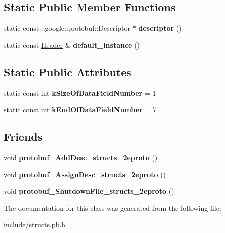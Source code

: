 \subsection*{Static Public Member Functions}
\begin{DoxyCompactItemize}
\item 
\hypertarget{classstruct_definitions_1_1_header_aa3a022ee50eba4caf6caa315e5986cc1}{}\label{classstruct_definitions_1_1_header_aa3a022ee50eba4caf6caa315e5986cc1} 
static const \+::google\+::protobuf\+::\+Descriptor $\ast$ {\bfseries descriptor} ()
\item 
\hypertarget{classstruct_definitions_1_1_header_a89695ae239efa3812e4d4b283a72f28e}{}\label{classstruct_definitions_1_1_header_a89695ae239efa3812e4d4b283a72f28e} 
static const \hyperlink{classstruct_definitions_1_1_header}{Header} \& {\bfseries default\+\_\+instance} ()
\end{DoxyCompactItemize}
\subsection*{Static Public Attributes}
\begin{DoxyCompactItemize}
\item 
\hypertarget{classstruct_definitions_1_1_header_a97581ebc6dd48fd42dab9c6d5c959be9}{}\label{classstruct_definitions_1_1_header_a97581ebc6dd48fd42dab9c6d5c959be9} 
static const int {\bfseries k\+Size\+Of\+Data\+Field\+Number} = 1
\item 
\hypertarget{classstruct_definitions_1_1_header_a36d0ee6deb64e230776f0fcf853a5f2e}{}\label{classstruct_definitions_1_1_header_a36d0ee6deb64e230776f0fcf853a5f2e} 
static const int {\bfseries k\+End\+Of\+Data\+Field\+Number} = 7
\end{DoxyCompactItemize}
\subsection*{Friends}
\begin{DoxyCompactItemize}
\item 
\hypertarget{classstruct_definitions_1_1_header_abcf9b7cc173b6d79696d01156751b8ce}{}\label{classstruct_definitions_1_1_header_abcf9b7cc173b6d79696d01156751b8ce} 
void {\bfseries protobuf\+\_\+\+Add\+Desc\+\_\+structs\+\_\+2eproto} ()
\item 
\hypertarget{classstruct_definitions_1_1_header_adb32752ff5178cb902966da6e3cb3bc6}{}\label{classstruct_definitions_1_1_header_adb32752ff5178cb902966da6e3cb3bc6} 
void {\bfseries protobuf\+\_\+\+Assign\+Desc\+\_\+structs\+\_\+2eproto} ()
\item 
\hypertarget{classstruct_definitions_1_1_header_ac2e4278d7604361fa6502b1cfbf9d980}{}\label{classstruct_definitions_1_1_header_ac2e4278d7604361fa6502b1cfbf9d980} 
void {\bfseries protobuf\+\_\+\+Shutdown\+File\+\_\+structs\+\_\+2eproto} ()
\end{DoxyCompactItemize}


The documentation for this class was generated from the following file\+:\begin{DoxyCompactItemize}
\item 
include/structs.\+pb.\+h\end{DoxyCompactItemize}
